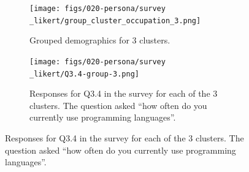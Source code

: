 \documentclass[020-persona\_validation.tex]{subfiles}
\begin{document}
        \begin{figure}[htb]
            \centering
            \begin{subfigure}[h]{0.45\textwidth}
                \centering
                \texttt{[image: figs/020-persona/survey\\\_likert/group\_cluster\_occupation\_3.png]}
                \caption[Grouped demographics for 3 clusters]
                {Grouped demographics for 3 clusters.
                }
                \label{sfig:cluster-grouped-demogrphics}
            \end{subfigure}
            \begin{subfigure}[h]{0.45\textwidth}
                \centering
                \texttt{[image: figs/020-persona/survey\\\_likert/Q3.4-group-3.png]}
                \caption[How often do you program (Q3.4) for 3 clusters]
                {Responses for Q3.4 in the survey for each of the 3 clusters.
                    The question asked ``how often do you currently use programming languages''.
                }
                \label{sfig:cluster-q3-4}
            \end{subfigure}


\end{figure}
\end{document}
